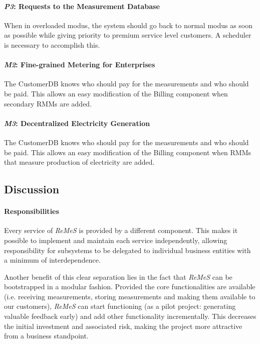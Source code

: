 \documentclass[a4paper,10pt]{article}
\newcommand{\rem}{\emph{ReMeS}\xspace}
\begin{document}
\paragraph{\emph{P3}: Requests to the Measurement Database}
When in overloaded modus, the system should go back to normal modus as soon as possible while giving priority to premium service level customers. A scheduler is necessary to accomplish this.

\paragraph{\emph{M2}: Fine-grained Metering for Enterprises}
The CustomerDB knows who should pay for the measurements and who should be paid. This allows an easy modification of the Billing component when secondary RMMs are added.

\paragraph{\emph{M3}: Decentralized Electricity Generation}
The CustomerDB knows who should pay for the measurements and who should be paid. This allows an easy modification of the Billing component when RMMs that measure production of electricity are added.


\subsection{Discussion}

\paragraph{Responsibilities}
Every service of \rem is provided by a different component. This makes it possible to implement and maintain each service independently, allowing responsibility for subsystems to be delegated to individual business entities with a minimum of interdependence.

Another benefit of this clear separation lies in the fact that \rem can be bootstrapped in a modular fashion. Provided the core functionalities are available (i.e. receiving measurements, storing measurements and making them available to our customers), \rem can start functioning (as a pilot project: generating valuable feedback early) and add other functionality incrementally. This decreases the initial investment and associated risk, making the project more attractive from a business standpoint.
\end{document}

